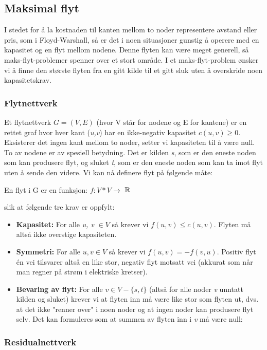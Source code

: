 \subsection{Maksimal flyt}
I stedet for å la kostnaden til kanten mellom to noder representere avstand eller pris, som i Floyd-Warshall, så er det i noen situasjoner gunstig å operere med en kapasitet og en flyt mellom nodene. Denne flyten kan være meget generell, så maks-flyt-problemer spenner over et stort område. I et maks-flyt-problem ønsker vi å finne den største flyten fra en gitt kilde til et gitt sluk uten å overskride noen kapasitetskrav.

\subsubsection{Flytnettverk}
Et flytnettverk $G = (V,E)$ (hvor V står for nodene og E for kantene) er en rettet graf hvor hver kant (\textit{u,v}) har en ikke-negativ kapasitet $c(u,v) \geq 0$. Eksisterer det ingen kant mellom to noder, setter vi kapasiteten til å være null. To av nodene er av spesiell betydning. Det er kilden \textit{s}, som er den eneste noden som kan produsere flyt, og sluket \textit{t}, som er den eneste noden som kan ta imot flyt uten å sende den videre. Vi kan nå definere flyt på følgende måte:
\begin{center}
En flyt i G er en funksjon: $f: V * V \rightarrow$  ${\Bbb R}$
\end{center}

\noindent slik at følgende tre krav er oppfylt:
\begin{itemize}
    \item \textbf{Kapasitet:} For alle \textit{u, v} $\in V$ så krever vi $f (u,v) \leq c (u,v)$. Flyten må altså ikke overstige kapasiteten.
    \item \textbf{Symmetri:} For alle $u,v \in V$ så krever vi $f (u,v) = -f(v,u)$. Positiv flyt én vei tilsvarer altså en like stor, negativ flyt motsatt vei (akkurat som når man regner på strøm i elektriske kretser).
    \item \textbf{Bevaring av flyt:} For alle $v \in V - \{s,t\}$ (altså for alle noder \textit{v} unntatt kilden og sluket) krever vi at flyten inn må være like stor som flyten ut, dvs. at det ikke "renner over" i noen noder og at ingen noder kan produsere flyt selv. Det kan formuleres som at summen av flyten inn i \textit{v} må være null:
\end{itemize}

\subsubsection{Residualnettverk}
